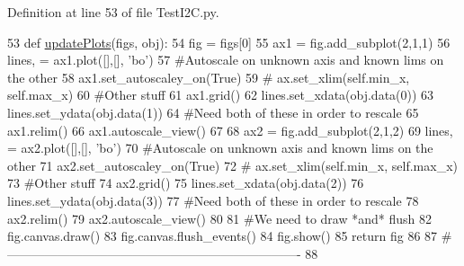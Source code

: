 Definition at line 53 of file Test\+I2\+C.\+py.


\begin{DoxyCode}
53 \textcolor{keyword}{def }\hyperlink{namespaceTestI2C_aa9a08a8ebd38789a067a3b54cdc231b5}{updatePlots}(figs, obj):
54     fig = figs[0]
55     ax1 = fig.add\_subplot(2,1,1)
56     lines, = ax1.plot([],[], \textcolor{stringliteral}{'bo'})
57     \textcolor{comment}{#Autoscale on unknown axis and known lims on the other}
58     ax1.set\_autoscaley\_on(\textcolor{keyword}{True})
59 \textcolor{comment}{#    ax.set\_xlim(self.min\_x, self.max\_x)}
60     \textcolor{comment}{#Other stuff}
61     ax1.grid()        
62     lines.set\_xdata(obj.data(0))
63     lines.set\_ydata(obj.data(1))
64     \textcolor{comment}{#Need both of these in order to rescale}
65     ax1.relim()
66     ax1.autoscale\_view()
67 
68     ax2 = fig.add\_subplot(2,1,2)
69     lines, = ax2.plot([],[], \textcolor{stringliteral}{'bo'})
70     \textcolor{comment}{#Autoscale on unknown axis and known lims on the other}
71     ax2.set\_autoscaley\_on(\textcolor{keyword}{True})
72 \textcolor{comment}{#    ax.set\_xlim(self.min\_x, self.max\_x)}
73     \textcolor{comment}{#Other stuff}
74     ax2.grid()        
75     lines.set\_xdata(obj.data(2))
76     lines.set\_ydata(obj.data(3))
77     \textcolor{comment}{#Need both of these in order to rescale}
78     ax2.relim()
79     ax2.autoscale\_view()
80 
81     \textcolor{comment}{#We need to draw *and* flush}
82     fig.canvas.draw()
83     fig.canvas.flush\_events()
84     fig.show()
85     \textcolor{keywordflow}{return} fig
86     
87 \textcolor{comment}{#----------------------------------------------------------------------}
88 
\end{DoxyCode}
